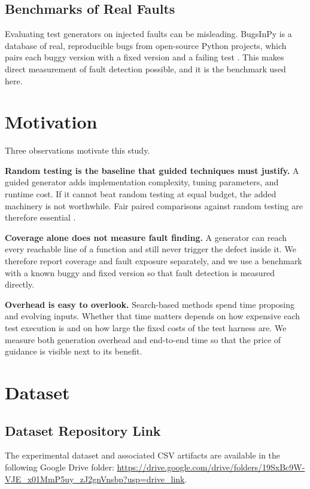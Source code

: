 \documentclass[12pt,onecolumn]{IEEEtran}
\begin{document}
\subsection{Benchmarks of Real Faults}

Evaluating test generators on injected faults can be misleading. BugsInPy is a database of real, reproducible bugs from open-source Python projects, which pairs each buggy version with a fixed version and a failing test \cite{widyasari2020}. This makes direct measurement of fault detection possible, and it is the benchmark used here.

\section{Motivation}

Three observations motivate this study.

\textbf{Random testing is the baseline that guided techniques must justify.}
A guided generator adds implementation complexity, tuning parameters, and runtime cost. If it cannot beat random testing at equal budget, the added machinery is not worthwhile. Fair paired comparisons against random testing are therefore essential \cite{shamshiri2018}.

\textbf{Coverage alone does not measure fault finding.}
A generator can reach every reachable line of a function and still never trigger the defect inside it. We therefore report coverage and fault exposure separately, and we use a benchmark with a known buggy and fixed version so that fault detection is measured directly.

\textbf{Overhead is easy to overlook.}
Search-based methods spend time proposing and evolving inputs. Whether that time matters depends on how expensive each test execution is and on how large the fixed costs of the test harness are. We measure both generation overhead and end-to-end time so that the price of guidance is visible next to its benefit.

\section{Dataset}

\subsection{Dataset Repository Link}
The experimental dataset and associated CSV artifacts are available in the following Google Drive folder: \url{https://drive.google.com/drive/folders/19SxBc9W-VJE_x01MmP5uy_zJ2gnVnsbp?usp=drive_link}.
\end{document}
